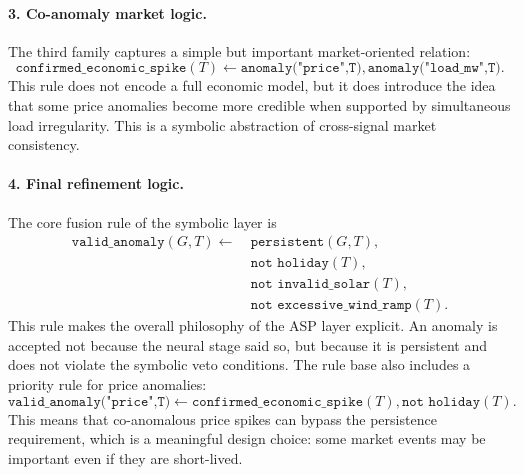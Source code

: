 \paragraph{3. Co-anomaly market logic.}
The third family captures a simple but important market-oriented relation:
\begin{equation}
	\texttt{confirmed\_economic\_spike}(T) \leftarrow
	\texttt{anomaly("price",T)},
	\texttt{anomaly("load\_mw",T)}.
	\label{eq:coanomaly_rule}
\end{equation}
This rule does not encode a full economic model, but it does introduce the idea that some price anomalies become more credible when supported by simultaneous load irregularity. This is a symbolic abstraction of cross-signal market consistency.

\paragraph{4. Final refinement logic.}
The core fusion rule of the symbolic layer is
\begin{align}
	\texttt{valid\_anomaly}(G,T) \leftarrow
	&\ \texttt{persistent}(G,T), \nonumber\\
	&\ \texttt{not holiday}(T), \nonumber\\
	&\ \texttt{not invalid\_solar}(T), \nonumber\\
	&\ \texttt{not excessive\_wind\_ramp}(T).
	\label{eq:valid_anomaly_rule}
\end{align}
This rule makes the overall philosophy of the ASP layer explicit. An anomaly is accepted not because the neural stage said so, but because it is persistent and does not violate the symbolic veto conditions. The rule base also includes a priority rule for price anomalies:
\begin{equation}
	\texttt{valid\_anomaly("price",T)} \leftarrow
	\texttt{confirmed\_economic\_spike}(T),
	\texttt{not holiday}(T).
	\label{eq:price_priority_rule}
\end{equation}
This means that co-anomalous price spikes can bypass the persistence requirement, which is a meaningful design choice: some market events may be important even if they are short-lived.

